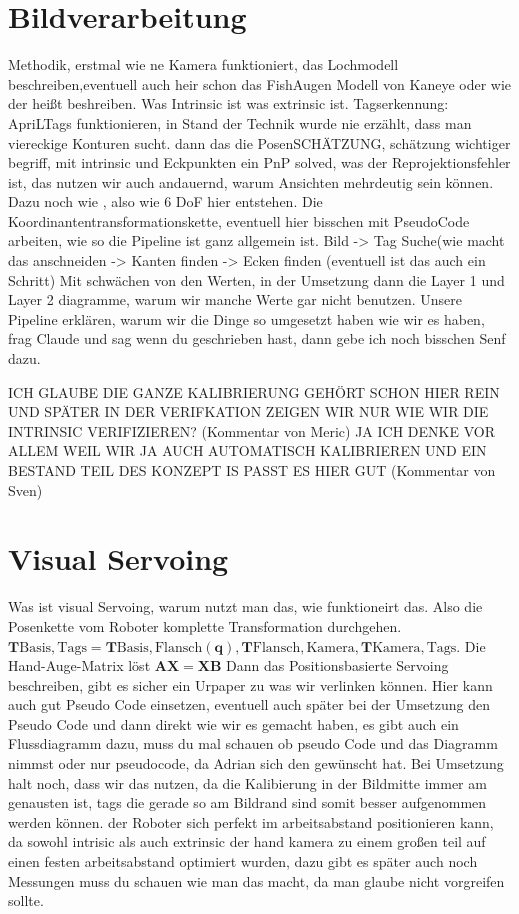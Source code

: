 \section{Bildverarbeitung}
\label{sec:bildverarbeitung}
Methodik, erstmal wie ne Kamera funktioniert, das Lochmodell beschreiben,eventuell auch heir schon das FishAugen Modell von Kaneye oder wie der heißt beshreiben. Was Intrinsic ist was extrinsic ist. Tagserkennung: ApriLTags funktionieren, in Stand der Technik wurde nie erzählt, dass man viereckige Konturen sucht. dann das die PosenSCHÄTZUNG, schätzung wichtiger begriff, mit intrinsic und Eckpunkten ein PnP solved, was der Reprojektionsfehler ist, das nutzen wir auch andauernd, warum Ansichten mehrdeutig sein können. Dazu noch wie , also wie 6 DoF hier entstehen. Die Koordinantentransformationskette, eventuell hier bisschen mit PseudoCode arbeiten, wie so die Pipeline ist ganz allgemein ist. Bild -> Tag Suche(wie macht das anschneiden -> Kanten finden -> Ecken finden (eventuell ist das auch ein Schritt) Mit schwächen von den Werten, in der Umsetzung dann die Layer 1 und Layer 2 diagramme, warum wir manche Werte gar nicht benutzen. Unsere Pipeline erklären, warum wir die Dinge so umgesetzt haben wie wir es haben, frag Claude und sag wenn du geschrieben hast, dann gebe ich noch bisschen Senf dazu.

ICH GLAUBE DIE GANZE KALIBRIERUNG GEHÖRT SCHON HIER REIN UND SPÄTER IN DER VERIFKATION ZEIGEN WIR NUR WIE WIR DIE INTRINSIC VERIFIZIEREN? (Kommentar von Meric) JA ICH DENKE VOR ALLEM WEIL WIR JA AUCH AUTOMATISCH KALIBRIEREN UND EIN BESTAND TEIL DES KONZEPT IS PASST ES HIER GUT (Kommentar von Sven)

\section{Visual Servoing}
\label{sec:servoing}
Was ist visual Servoing, warum nutzt man das, wie funktioneirt das. Also die Posenkette vom Roboter komplette Transformation durchgehen. $\mathbf{T}{\mathrm{Basis,Tags}} = \mathbf{T}{\mathrm{Basis,Flansch}}(\mathbf{q}),\mathbf{T}{\mathrm{Flansch,Kamera}},\mathbf{T}{\mathrm{Kamera,Tags}}$. Die Hand-Auge-Matrix löst $\mathbf{AX}=\mathbf{XB}$ 
Dann das Positionsbasierte Servoing beschreiben, gibt es sicher ein Urpaper zu was wir verlinken können. Hier kann auch gut Pseudo Code einsetzen, eventuell auch später bei der Umsetzung den Pseudo Code und dann direkt wie wir es gemacht haben, es gibt auch ein Flussdiagramm dazu, muss du mal schauen ob pseudo Code und das Diagramm nimmst oder nur pseudocode, da Adrian sich den gewünscht hat.
 Bei Umsetzung halt noch, dass wir das nutzen, da die Kalibierung in der Bildmitte immer am genausten ist, tags die gerade so am Bildrand sind somit besser aufgenommen werden können. der Roboter sich perfekt im arbeitsabstand positionieren kann, da sowohl intrisic als auch extrinsic der hand kamera zu einem großen teil auf einen festen arbeitsabstand optimiert wurden, dazu gibt es später auch noch Messungen muss du schauen wie man das macht, da man glaube nicht vorgreifen sollte.

